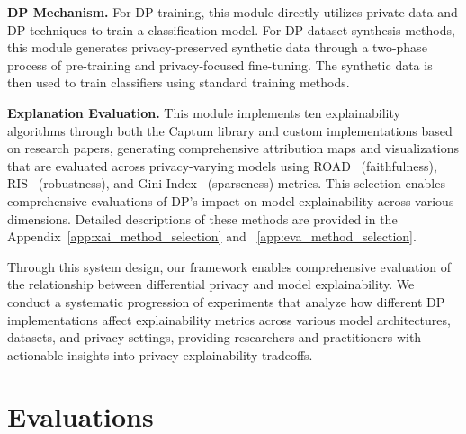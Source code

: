 \documentclass{article}
\begin{document}
\noindent \textbf{DP Mechanism. }
For DP training, this module directly utilizes private data and DP techniques to train a classification model.
For DP dataset synthesis methods, this module generates privacy-preserved synthetic data through a two-phase process of pre-training and privacy-focused fine-tuning. The synthetic data is then used to train classifiers using standard training methods.



\noindent \textbf{Explanation Evaluation. }
This module implements ten explainability algorithms through both the Captum library and custom implementations based on research papers, generating comprehensive attribution maps and visualizations that are evaluated across privacy-varying models using ROAD~\cite{rong2022consistent} (faithfulness), RIS~\cite{agarwal2022rethinking} (robustness), and Gini Index~\cite{chalasani2020concise} (sparseness) metrics. 
This selection enables comprehensive evaluations of DP's impact on model explainability across various dimensions. Detailed descriptions of these methods are provided in the Appendix~\ref{app:xai_method_selection} and ~\ref{app:eva_method_selection}.






Through this system design, our framework enables comprehensive evaluation of the relationship between differential privacy and model explainability. We conduct a systematic progression of experiments that analyze how different DP implementations affect explainability metrics across various model architectures, datasets, and privacy settings, providing researchers and practitioners with actionable insights into privacy-explainability tradeoffs.

\section{Evaluations}\label{sec:evaluations}
\end{document}
